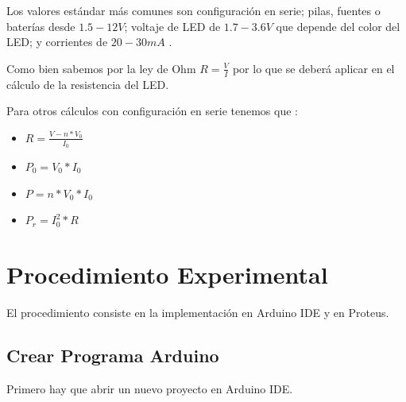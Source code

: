 \documentclass{article}
\begin{document}
Los valores estándar más comunes son configuración en serie; pilas, fuentes o baterías desde $1.5-12V$; voltaje de LED de $1.7-3.6V$ que depende del color del LED; y corrientes de $20-30mA$ \cite{szyk-2022}.

\bigbreak

Como bien sabemos por la ley de Ohm $R = \frac{V}{I}$ por lo que se deberá aplicar en el cálculo de la resistencia del LED.

\bigbreak

Para otros cálculos con configuración en serie tenemos que \cite{szyk-2022}:

\begin{itemize}
    \item $R = \frac{V - n*V_0}{I_0}$
    \item $P_0 = V_0 * I_0$
    \item $P = n * V_0 * I_0$
    \item $P_r = I_0^2 * R$
\end{itemize}

\section{Procedimiento Experimental}

El procedimiento consiste en la implementación en Arduino IDE y en Proteus.

\subsection{Crear Programa Arduino}

Primero hay que abrir un nuevo proyecto en Arduino IDE.
\end{document}
